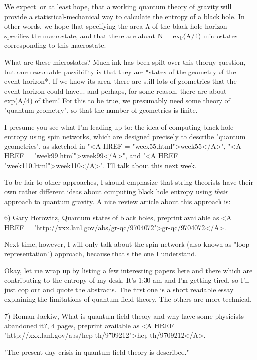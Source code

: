 We expect, or at least hope, that a working quantum theory of gravity
will provide a statistical-mechanical way to calculate the entropy of a
black hole.   In other words, we hope that specifying the area A of
the black hole horizon specifies the macrostate, and that there are
about N = exp(A/4) microstates corresponding to this macrostate.  

What are these microstates?  Much ink has been spilt over this thorny
question, but one reasonable possibility is that they are *states of the
geometry of the event horizon*.  If we know its area, there are still
lots of geometries that the event horizon could have... and perhaps, for
some reason, there are about exp(A/4) of them!  For this to be true, we
presumably need some theory of "quantum geometry", so that the number of
geometries is finite.  

I presume you see what I'm leading up to: the idea of computing black
hole entropy using spin networks, which are designed precisely to
describe "quantum geometries", as sketched in "<A HREF = "week55.html">week55</A>", "<A HREF = "week99.html">week99</A>", and
"<A HREF = "week110.html">week110</A>".  I'll talk about this next week.

To be fair to other approaches, I should emphasize that string theorists
have their own rather different ideas about computing black hole entropy
using \emph{their} approach to quantum gravity.  A nice review article about
this approach is:

6) Gary Horowitz, Quantum states of black holes, preprint available as
<A HREF = "http://xxx.lanl.gov/abs/gr-qc/9704072">gr-qc/9704072</A>.

Next time, however, I will only talk about the spin network (also known
as "loop representation") approach, because that's the one I understand.

Okay, let me wrap up by listing a few interesting papers here and there
which are contributing to the entropy of my desk.  It's 1:30 am and I'm
getting tired, so I'll just cop out and quote the abstracts.  The first
one is a short readable essay explaining the limitations of quantum
field theory.  The others are more technical.

7) Roman Jackiw, What is quantum field theory and why have some
physicists abandoned it?, 4 pages, preprint available as <A HREF = "http://xxx.lanl.gov/abs/hep-th/9709212">hep-th/9709212</A>.

"The present-day crisis in quantum field theory is described."

